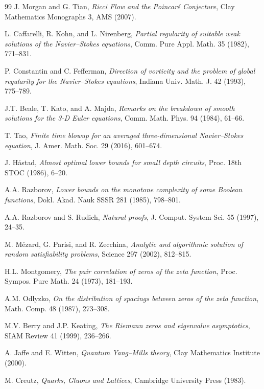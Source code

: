 \documentclass[11pt]{article}
\begin{document}
\begin{thebibliography}{99}
J. Morgan and G. Tian, \emph{Ricci Flow and the Poincar\'e Conjecture},
Clay Mathematics Monographs 3, AMS (2007).

L. Caffarelli, R. Kohn, and L. Nirenberg, \emph{Partial regularity of
suitable weak solutions of the Navier--Stokes equations},
Comm. Pure Appl. Math. 35 (1982), 771--831.

P. Constantin and C. Fefferman, \emph{Direction of vorticity and the
problem of global regularity for the Navier--Stokes equations},
Indiana Univ. Math. J. 42 (1993), 775--789.

J.T. Beale, T. Kato, and A. Majda, \emph{Remarks on the breakdown
of smooth solutions for the 3-D Euler equations},
Comm. Math. Phys. 94 (1984), 61--66.

T. Tao, \emph{Finite time blowup for an averaged three-dimensional
Navier--Stokes equation}, J. Amer. Math. Soc. 29 (2016), 601--674.

J. H\aa stad, \emph{Almost optimal lower bounds for small depth
circuits}, Proc. 18th STOC (1986), 6--20.

A.A. Razborov, \emph{Lower bounds on the monotone complexity of some
Boolean functions}, Dokl. Akad. Nauk SSSR 281 (1985), 798--801.

A.A. Razborov and S. Rudich, \emph{Natural proofs},
J. Comput. System Sci. 55 (1997), 24--35.

M. M\'ezard, G. Parisi, and R. Zecchina, \emph{Analytic and
algorithmic solution of random satisfiability problems},
Science 297 (2002), 812--815.

H.L. Montgomery, \emph{The pair correlation of zeros of the zeta
function}, Proc. Sympos. Pure Math. 24 (1973), 181--193.

A.M. Odlyzko, \emph{On the distribution of spacings between zeros of
the zeta function}, Math. Comp. 48 (1987), 273--308.

M.V. Berry and J.P. Keating, \emph{The Riemann zeros and eigenvalue
asymptotics}, SIAM Review 41 (1999), 236--266.

A. Jaffe and E. Witten, \emph{Quantum Yang--Mills theory},
Clay Mathematics Institute (2000).

M. Creutz, \emph{Quarks, Gluons and Lattices},
Cambridge University Press (1983).


\end{thebibliography}
\end{document}

